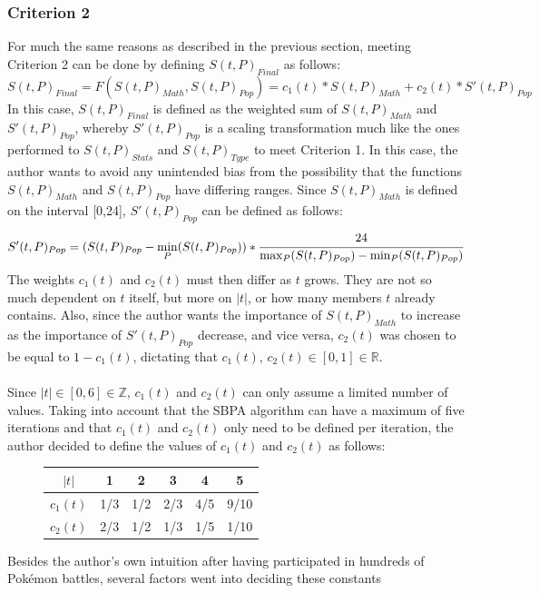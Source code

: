 \documentclass{article}
\begin{document}
\subsubsection{Criterion 2}
For much the same reasons as described in the previous section, meeting Criterion 2 can be done by defining $S(t,P)_{Final}$ as follows:
\begin{equation*}
	S(t,P)_{Final}=F(S(t,P)_{Math},S(t,P)_{Pop})=c_1(t)*S(t,P)_{Math}+c_2(t)*S'(t,P)_{Pop}
\end{equation*}
In this case, $S(t,P)_{Final}$ is defined as the weighted sum of $S(t,P)_{Math}$ and $S'(t,P)_{Pop}$, whereby $S'(t,P)_{Pop}$ is a scaling transformation much like the ones performed to $S(t,P)_{Stats}$ and $S(t,P)_{Type}$ to meet Criterion 1. In this case, the author wants to avoid any unintended bias from the possibility that the functions $S(t,P)_{Math}$ and $S(t,P)_{Pop}$ have differing ranges. Since $S(t,P)_{Math}$ is defined on the interval [0,24], $S'(t,P)_{Pop}$ can be defined as follows:
\begin{equation*}
	S'(t,P)_{Pop}=(S(t,P)_{Pop}-\min_P(S(t,P)_{Pop}))*\cfrac{24}{\max_P(S(t,P)_{Pop})-\min_P(S(t,P)_{Pop})}
\end{equation*}
The weights $c_1(t)$ and $c_2(t)$ must then differ as $t$ grows. They are not so much dependent on $t$ itself, but more on $|t|$, or how many members $t$ already contains. Also, since the author wants the importance of $S(t,P)_{Math}$ to increase as the importance of $S'(t,P)_{Pop}$ decrease, and vice versa, $c_2(t)$ was chosen to be equal to $1-c_1(t)$, dictating that $c_1(t)\text{, }c_2(t)\in[0,1]\in\mathbb{R}$.\\\\
Since $|t|\in [0,6]\in\mathbb{Z}$, $c_1(t)$ and $c_2(t)$ can only assume a limited number of values. Taking into account that the SBPA algorithm can have a maximum of five iterations and that $c_1(t)$ and $c_2(t)$ only need to be defined per iteration, the author decided to define the values of $c_1(t)$ and $c_2(t)$ as follows:
\begin{figure}[H]
	\begin{tabular}{c||c|c|c|c|c}
		$|t|$&1&2&3&4&5\\
		\hline
		$c_1(t)$&1/3&1/2&2/3&4/5&9/10\\
		$c_2(t)$&2/3&1/2&1/3&1/5&1/10
	\end{tabular}
	\centering
\end{figure}
Besides the author's own intuition after having participated in hundreds of Pok\'emon battles, several factors went into deciding these constants
\end{document}
